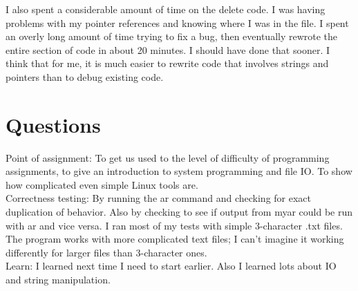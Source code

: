 \documentclass[11pt]{article}
\begin{document}
I also spent a considerable amount of time on the delete code. I was having problems with my pointer references and knowing where I was in the file. I spent an overly long
amount of time trying to fix a bug, then eventually rewrote the entire section of code in about 20 minutes. I should have done that sooner. I think that for me, it is much 
easier to rewrite code that involves strings and pointers than to debug existing code. \\

\section{Questions}
Point of assignment: To get us used to the level of difficulty of programming assignments, to give an introduction to system programming and file IO. To show how complicated
even simple Linux tools are. \\
Correctness testing: By running the ar command and checking for exact duplication of behavior. Also by checking to see if output from myar could be run with ar and 
vice versa. I ran most of my tests with simple 3-character .txt files. The program works with more complicated text files; I can't imagine it working differently for larger
files than 3-character ones. \\
Learn: I learned next time I need to start earlier. Also I learned lots about IO and string manipulation.\\
\end{document}
